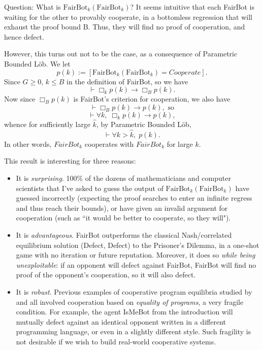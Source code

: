 \documentclass[onecolumn,authordate]{miri-tech-article}
\numberwithin{equation}{section}
\theoremstyle{definition}
\newcommand{\proves}[1]{\underset{#1}{\vdash}}
\newcommand{\bx}[1]{\Box_{#1}}
\renewcommand{\implies}{\rightarrow}
\renewcommand{\-}{^{-1}}
\newcommand{\FB}{\mathrm{FairBot}}
\begin{document}
Question: What is $\FB_k(\FB_k)$?  It seems intuitive that each FairBot is waiting for the other to provably cooperate, in a bottomless regression that will exhaust the proof bound B.  Thus, they will find no proof of cooperation, and hence defect.  

However, this turns out not to be the case, as a consequence of Parametric Bounded L\"{o}b.  We let $$p(k) := [\FB_k(\FB_k) = Cooperate].$$
Since $G\geq 0$, $k \leq B$ in the definition of FairBot, so we have 
$$\proves{} \bx{k}p(k) \implies \bx{B}p(k).$$
Now since $\bx{B}p(k)$ is FairBot's criterion for cooperation, we also have 
$$\proves{} \bx{B}p(k) \implies p(k), \textrm{ \ so}$$ 
$$\proves{} \forall k, \; \bx{k} p(k) \implies p(k),$$
whence for sufficiently large $\hat k$, by Parametric Bounded L\"{o}b,
$$\proves{} \forall k>\hat k,\; p(k).$$
In other words, $FairBot_k$ cooperates with $FairBot_k$ for large $k$.  

This result is interesting for three reasons:

\begin{itemize}
\item[1.]  It is {\em surprising}.  100\% of the dozens of mathematicians and computer scientists that I've asked to guess the output of $\FB_k(\FB_k)$ have guessed incorrectly (expecting the proof searches to enter an infinite regress and thus reach their bounds), or have given an invalid argument for cooperation (such as ``it would be better to cooperate, so they will").
\item[2.] It is {\em advantageous}. FairBot outperforms the classical Nash/correlated equilibrium solution (Defect, Defect) to the Prisoner's Dilemma, in a one-shot game with no iteration or future reputation.  Moreover, it does so {\em while being unexploitable}: if an opponent will defect against FairBot, FairBot will find no proof of the opponent's cooperation, so it will also defect.  
\item[3.] It is {\em robust}.  Previous examples of cooperative program equilibria studied by \citet{Tennenholtz:2004:Program} and \citet{Fortnow:2009:Program} all involved cooperation based on {\em equality of programs}, a very fragile condition.  For example, the agent IsMeBot from the introduction will mutually defect against an identical opponent written in a different programming language, or even in a slightly different style.  Such fragility is not desirable if we wish to build real-world cooperative systems.  
\end{itemize}
\end{document}
